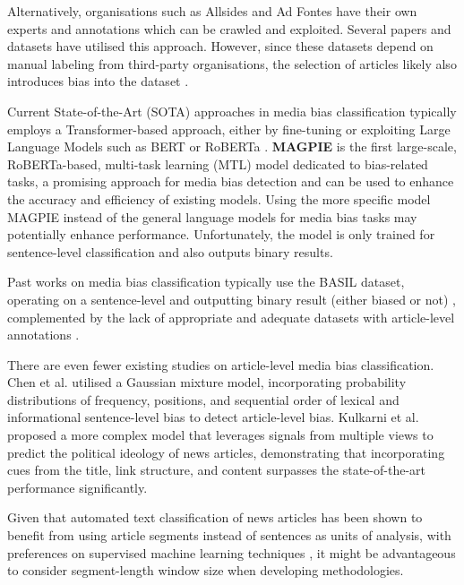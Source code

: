 Alternatively, organisations such as Allsides and Ad Fontes have their own experts and annotations which can be crawled and exploited. Several papers and datasets \cite{spinde-2023-bat,chen-2020-nlpcss,kulkarni-2018-multi-view} have utilised this approach. However, since these datasets depend on manual labeling from third-party organisations, the selection of articles likely also introduces bias into the dataset \cite{spinde-2023-bat}.

Current State-of-the-Art (SOTA) approaches in media bias classification typically employs a Transformer-based approach, either by fine-tuning or exploiting Large Language Models such as BERT \cite{devlin-2019-bert} or RoBERTa \cite{liu-2019-roberta}. \textbf{MAGPIE} \cite{horych-2024-magpie} is the first large-scale, RoBERTa-based, multi-task learning (MTL) model dedicated to bias-related tasks, a promising approach for media bias detection and can be used to enhance the accuracy and efficiency of existing models. Using the more specific model MAGPIE instead of the general language models for media bias tasks may potentially enhance performance. Unfortunately, the model is only trained for sentence-level classification and also outputs binary results.

Past works on media bias classification typically use the BASIL dataset, operating on a sentence-level and outputting binary result (either biased or not) \cite{maab-2023-lexical-bias-detection, maab-2023-target-aware, guo-2022-modeling, van-den-berg-2020-context,lee-2021-unifying,lei-2022-sentence,lei-2024-event-relation}, complemented by the lack of appropriate and adequate datasets with article-level annotations \cite{demidov-2023-political-bias-classification}.

There are even fewer existing studies on article-level media bias classification. Chen et al. \cite{chen-2020-detecting-media-bias-gaussian} utilised a Gaussian mixture model, incorporating probability distributions of frequency, positions, and sequential order of lexical and informational sentence-level bias to detect article-level bias. Kulkarni et al. \cite{kulkarni-2018-multi-view} proposed a more complex model that leverages signals from multiple views to predict the political ideology of news articles, demonstrating that incorporating cues from the title, link structure, and content surpasses the state-of-the-art performance significantly.


Given that automated text classification of news articles has been shown to benefit from using article segments instead of sentences as units of analysis, with preferences on supervised machine learning techniques \cite{barbera-2021-article-classification}, it might be advantageous to consider segment-length window size when developing methodologies.


